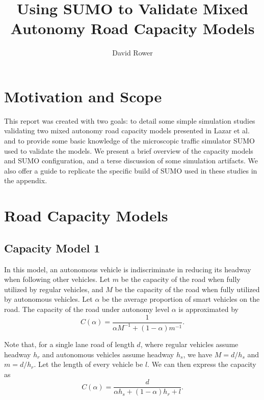 \documentclass[11pt,nofootinbib]{revtex4}
\begin{document}
\title{Using SUMO to Validate Mixed Autonomy Road Capacity Models}
\author{David Rower}

\maketitle

\section{Motivation and Scope}
This report was created with two goals: to detail some simple simulation studies validating two mixed autonomy road capacity models presented in Lazar et al. \cite{Lazar1} and to provide some basic knowledge of the microscopic traffic simulator SUMO used to validate the models. We present a brief overview of the capacity models and SUMO configuration, and a terse discussion of some simulation artifacts. We also offer a guide to replicate the specific build of SUMO used in these studies in the appendix.

\section{Road Capacity Models}
\subsection{Capacity Model 1}
In this model, an autonomous vehicle is indiscriminate in reducing its headway when following other vehicles. Let $m$ be the capacity of the road when fully utilized by regular vehicles, and $M$ be the capacity of the road when fully utilized by autonomous vehicles. Let $\alpha$ be the average proportion of smart vehicles on the road. The capacity of the road under autonomy level $\alpha$ is approximated by 
\begin{equation}
    C(\alpha) = \frac{1}{\alpha M^{-1} + (1-\alpha)m^{-1}}. 
\end{equation}

Note that, for a single lane road of length $d$, where regular vehicles assume headway $h_{r}$ and autonomous vehicles assume headway $h_{s}$, we have $M = d/h_{s}$ and $m = d/h_{r}$. Let the length of every vehicle be $l$. We can then express the capacity as 
\begin{equation}
    C(\alpha) = \frac{d}{\alpha h_s + (1-\alpha)h_r + l}. 
\end{equation}
\end{document}
